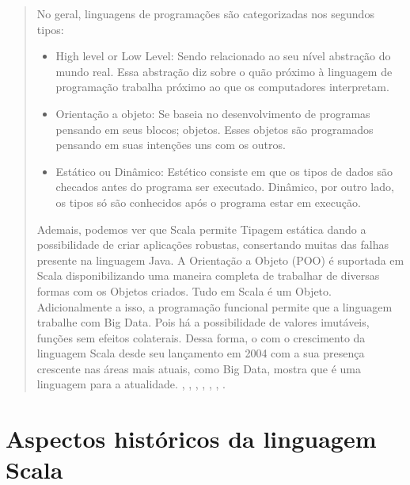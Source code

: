 \begin{quote}


   \hspace{2.5mm} No geral, linguagens de programações são categorizadas nos segundos tipos:
   \begin{itemize}
      \item  High level or Low Level:  Sendo relacionado ao seu nível abstração do mundo real. Essa abstração diz sobre o quão próximo à linguagem de programação trabalha próximo ao que os computadores interpretam.
      \item  Orientação a objeto:  Se baseia no desenvolvimento de programas pensando em seus blocos; objetos. Esses objetos são programados pensando em suas intenções uns com os outros.
      \item  Estático ou Dinâmico: Estético consiste em que os tipos de dados são checados antes do programa ser executado. Dinâmico, por outro lado, os tipos só são conhecidos após o programa estar em execução.
   \end{itemize}


   Ademais, podemos ver que Scala permite Tipagem estática dando a possibilidade de criar aplicações robustas, consertando muitas das falhas presente na linguagem Java. A Orientação a Objeto (POO) é suportada em Scala disponibilizando uma maneira completa de trabalhar de diversas formas com os Objetos criados. Tudo em Scala é um Objeto. Adicionalmente a isso, a programação funcional permite que a linguagem trabalhe com Big Data. Pois há a possibilidade de valores imutáveis, funções sem efeitos colaterais.
   Dessa forma, o com o crescimento da linguagem Scala desde seu lançamento em 2004 com a sua presença crescente nas áreas mais atuais, como Big Data, mostra que é uma linguagem para a atualidade.
   \cite{Elahi}, \cite{Nilanjan}, \cite{Wampler2021}, \cite{Data1},
   \cite{Data2}, \cite{web}, \cite{Whaling}.

\end{quote}


\section{Aspectos hist\'{o}ricos da linguagem Scala}

